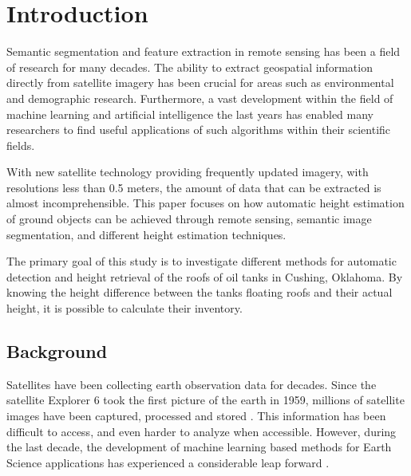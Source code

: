 \chapter{Introduction}
Semantic segmentation and feature extraction in remote sensing has been a field of research for many decades. The ability to extract geospatial information directly from satellite imagery has been crucial for areas such as environmental and demographic research. Furthermore, a vast development within the field of machine learning and artificial intelligence the last years has enabled many researchers to find useful applications of such algorithms within their scientific fields.

With new satellite technology providing frequently updated imagery, with resolutions less than 0.5 meters, the amount of data that can be extracted is almost incomprehensible. This paper focuses on how automatic height estimation of ground objects can be achieved through remote sensing, semantic image segmentation, and different height estimation techniques.

The primary goal of this study is to investigate different methods for automatic detection and height retrieval of the roofs of oil tanks in Cushing, Oklahoma. By knowing the height difference between the tanks floating roofs and their actual height, it is possible to calculate their inventory.

\section{Background}

Satellites have been collecting earth observation data for decades. Since the satellite Explorer 6 took the first picture of the earth in 1959, millions of satellite images have been captured, processed and stored \cite{Esa2009a}. This information has been difficult to access, and even harder to analyze when accessible. However, during the last decade, the development of machine learning based methods for Earth Science applications has experienced a considerable leap forward \cite{Lary2010}.

